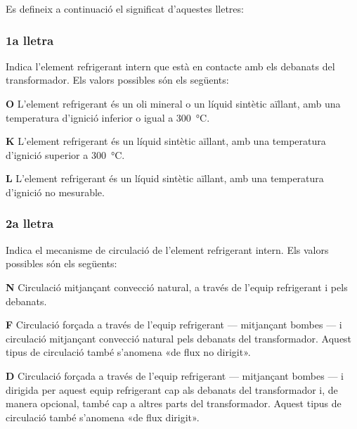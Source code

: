 Es defineix a continuació el significat d'aquestes lletres:

\subsubsection*{1a lletra}
Indica l'element refrigerant intern que està en
contacte amb els debanats del transformador. Els valors possibles
són els següents:

\begin{list}{}
   {\setlength{\labelwidth}{10mm} \setlength{\leftmargin}{10mm} \setlength{\labelsep}{2mm}}
   \item[\textbf{O}] L'element refrigerant és un oli mineral o un líquid sintètic aïllant, amb una temperatura d'ignició
   inferior o igual a \qty{300}{\degreeCelsius}.
   \item[\textbf{K}] L'element refrigerant és un líquid sintètic aïllant, amb una temperatura d'ignició
   superior a \qty{300}{\degreeCelsius}.
   \item[\textbf{L}] L'element refrigerant és un líquid sintètic aïllant, amb una temperatura d'ignició
   no mesurable.
\end{list}
  

\subsubsection*{2a lletra}
Indica el mecanisme de circulació de l'element
refrigerant intern. Els valors possibles són els següents:

\begin{list}{}
   {\setlength{\labelwidth}{10mm} \setlength{\leftmargin}{10mm} \setlength{\labelsep}{2mm}}
   \item[\textbf{N}] Circulació mitjançant convecció natural,
    a través de l'equip refrigerant i pels debanats.
   \item[\textbf{F}] Circulació forçada a través de l'equip refrigerant --- mitjançant bombes ---
    i circulació mitjançant convecció natural pels debanats del
    transformador. Aquest tipus de circulació també s'anomena «de flux no
    dirigit».
   \item[\textbf{D}] Circulació forçada a través de l'equip refrigerant --- mitjançant bombes ---
    i dirigida per aquest equip refrigerant cap als debanats del
    transformador i, de manera opcional, també cap a altres parts del transformador. Aquest
    tipus de circulació també s'anomena «de flux dirigit».
\end{list}
  

